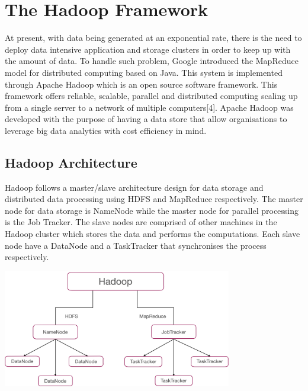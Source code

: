 \documentclass[11pt]{book}
\begin{document}
\chapter{The Hadoop Framework}

At present, with data being generated at an exponential rate, there is the need to deploy data intensive application and storage clusters in order to keep up with the amount of data. To handle such problem, Google introduced the MapReduce model for distributed computing based on Java. This system is implemented through Apache Hadoop which is an open source software framework. This framework offers reliable, scalable, parallel and distributed computing scaling up from a single server to a network of multiple computers[4]. Apache Hadoop was developed with the purpose of having a data store that allow organisations to leverage big data analytics with cost efficiency in mind.\\


\section{Hadoop Architecture}

Hadoop follows a master/slave architecture design for data storage and distributed data processing using HDFS and MapReduce respectively. The master node for data storage is NameNode while the master node for parallel processing is the Job Tracker. The slave nodes are comprised of other machines in the Hadoop cluster which stores the data and performs the computations. Each slave node have a DataNode and a TaskTracker that synchronises the process respectively. \\

\begin{center}
 \includegraphics[width=10cm]{hadoop}\\
 \end{center}
\end{document}

